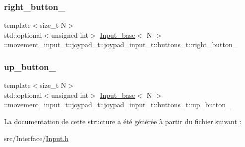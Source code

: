 \subsubsection{\texorpdfstring{right\+\_\+button\+\_\+}{right\_button\_}}
{\footnotesize\ttfamily template$<$size\+\_\+t N$>$ \\
std\+::optional$<$unsigned int$>$ \hyperlink{class_input__base}{Input\+\_\+base}$<$ N $>$\+::movement\+\_\+input\+\_\+t\+::joypad\+\_\+t\+::joypad\+\_\+input\+\_\+t\+::buttons\+\_\+t\+::right\+\_\+button\+\_\+}

\mbox{\label{struct_input__base_1_1movement__input__t_1_1joypad__t_1_1joypad__input__t_1_1buttons__t_a239929c919634205fe86f61208515848}} 
\subsubsection{\texorpdfstring{up\+\_\+button\+\_\+}{up\_button\_}}
{\footnotesize\ttfamily template$<$size\+\_\+t N$>$ \\
std\+::optional$<$unsigned int$>$ \hyperlink{class_input__base}{Input\+\_\+base}$<$ N $>$\+::movement\+\_\+input\+\_\+t\+::joypad\+\_\+t\+::joypad\+\_\+input\+\_\+t\+::buttons\+\_\+t\+::up\+\_\+button\+\_\+}



La documentation de cette structure a été générée à partir du fichier suivant \+:\begin{DoxyCompactItemize}
\item 
src/\+Interface/\hyperlink{_input_8h}{Input.\+h}\end{DoxyCompactItemize}
